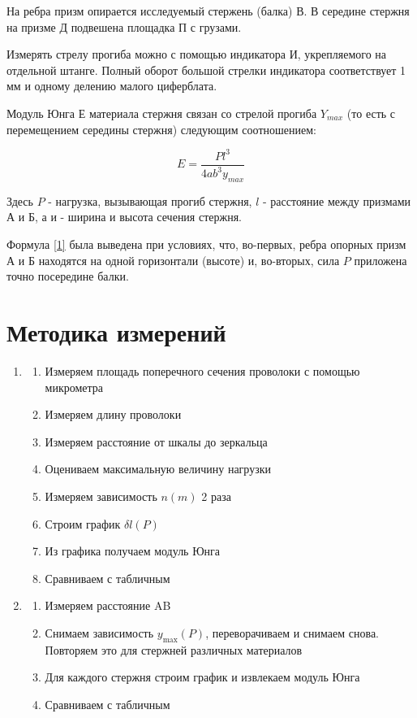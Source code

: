 \documentclass[a4paper,12pt]{article} %
\begin{document}
    На ребра призм опирается исследуемый стержень (балка) В. В середине стержня на призме Д подвешена площадка П с грузами. 
    
    Измерять стрелу прогиба можно с помощью индикатора И, укрепляемого на отдельной штанге. Полный оборот большой стрелки индикатора соответствует 1 мм и одному делению малого циферблата.
    
    Модуль Юнга Е материала стержня связан со стрелой прогиба $Y_{max}$ (то есть с перемещением середины стержня) следующим соотношением:
    
    \begin{equation} \label{1}
        E = \frac {Pl^3}{4ab^3y_{max}}
    \end{equation}
    
    Здесь $ P $  - нагрузка, вызывающая прогиб стержня, $ l $  - расстояние между призмами А и Б, а и - ширина и высота сечения стержня.

    Формула \eqref{1} была выведена при условиях, что, во-первых, ребра опорных призм А и Б находятся на одной горизонтали (высоте) и, во-вторых, сила $ P $  приложена точно посередине балки.

	\section{Методика измерений}
    \begin{enumerate}
        \item \begin{enumerate}
            \item Измеряем площадь поперечного сечения проволоки с помощью микрометра
            \item Измеряем длину проволоки 
            \item Измеряем расстояние от шкалы до зеркальца
            \item Оцениваем максимальную величину нагрузки
            \item Измеряем зависимость $ n(m) $ 2 раза
            \item Строим график $\delta l (P)$
            \item  Из графика получаем модуль Юнга
            \item Сравниваем с табличным
        \end{enumerate}
        \item \begin{enumerate}
            \item Измеряем расстояние AB
            \item Снимаем зависимость $ y_{\max}(P)$, переворачиваем и снимаем снова. Повторяем это для стержней различных материалов
            \item Для каждого стержня строим график и извлекаем модуль Юнга
            \item Сравниваем с табличным
        \end{enumerate}
    \end{enumerate}
\end{document}

